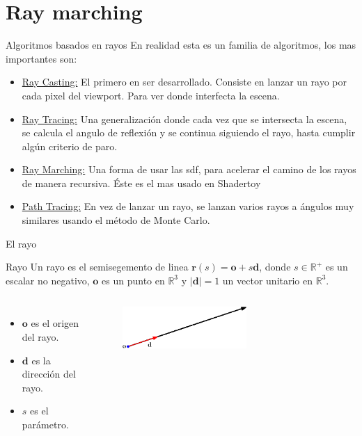 \section{Ray marching}
\begin{frame}{Algoritmos basados en rayos}
En realidad esta es un familia de algoritmos, los mas importantes son:

\begin{itemize}
    \item \href{https://en.wikipedia.org/wiki/Ray_casting}{Ray Casting:} El primero en ser desarrollado. Consiste en lanzar un rayo por cada pixel del viewport. Para ver donde interfecta la escena.
    \item \href{https://en.wikipedia.org/wiki/Ray_tracing_(graphics)}{Ray Tracing:} Una generalización donde cada vez que se intersecta la escena, se calcula el angulo de reflexión y se continua siguiendo el rayo, hasta cumplir algún criterio de paro.
    \item \href{https://en.wikipedia.org/wiki/Ray_marching}{Ray Marching:} Una forma de usar las sdf, para acelerar el camino de los rayos de manera recursiva. Éste es el mas usado en Shadertoy
    \item \href{https://en.wikipedia.org/wiki/Path_tracing}{Path Tracing:} En vez de lanzar un rayo, se lanzan varios rayos a ángulos muy similares usando el método de Monte Carlo.
\end{itemize}

\end{frame}

\begin{frame}{El rayo}
\begin{block}{Rayo}
Un rayo es el semisegemento de linea $\mathbf{r}(s) = \mathbf{o} + s  \mathbf{d}$, donde $s \in \mathbb{R}^{+}$ es un escalar no negativo, $\mathbf{o}$ es un punto en $\mathbb{R}^3$ y $|\mathbf{d}| = 1$ un vector unitario en $\mathbb{R}^3$.

\end{block}

\begin{columns}
\begin{itemize}
    \item $\mathbf{o}$ es el origen del rayo.
    \item $\mathbf{d}$ es la dirección del rayo.
    \item $s$ es el parámetro.
\end{itemize}    
\begin{figure}[htp]
    \centering
    \includegraphics[width=0.6\textwidth]{img/ray.eps}    
\end{figure}
\end{columns}
\end{frame}

